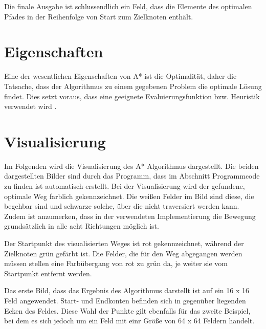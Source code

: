 \documentclass[10pt,twocolumn]{scrartcl}
\begin{document}
Die finale Ausgabe ist schlussendlich ein Feld, dass die Elemente des optimalen Pfades in der Reihenfolge von Start zum Zielknoten enthält.

\section*{Eigenschaften}

Eine der wesentlichen Eigenschaften von A* ist die Optimalität, daher die Tatsache, dass der Algorithmus zu einem gegebenen Problem die optimale Lösung findet. Dies setzt voraus, dass eine geeignete Evaluierungsfunktion bzw. Heuristik verwendet wird \cite{b1}. 




\section*{Visualisierung}

Im Folgenden wird die Visualisierung des A* Algorithmus dargestellt.
Die beiden dargestellten Bilder sind durch das Programm, dass im Abschnitt Programmcode zu finden ist automatisch erstellt.
Bei der Visualisierung wird der gefundene, optimale Weg farblich gekennzeichnet.
Die weißen Felder im Bild sind diese, die begehbar sind und schwarze solche, über die nicht traversiert werden kann.
Zudem ist anzumerken, dass in der verwendeten Implementierung die Bewegung grundsätzlich in alle acht Richtungen möglich ist.

Der Startpunkt des visualisierten Weges ist rot gekennzeichnet, während der Zielknoten grün gefärbt ist.
Die Felder, die für den Weg abgegangen werden müssen stellen eine Farbübergang von rot zu grün da, je weiter sie vom Startpunkt entfernt werden.

Das erste Bild, dass das Ergebnis des Algorithmus darstellt ist auf ein 16 x 16 Feld angewendet.
Start- und Endkonten befinden sich in gegenüber liegenden Ecken des Feldes.
Diese Wahl der Punkte gilt ebenfalls für das zweite Beispiel, bei dem es sich jedoch um ein Feld mit einr Größe von 64 x 64 Feldern handelt.
\end{document}
